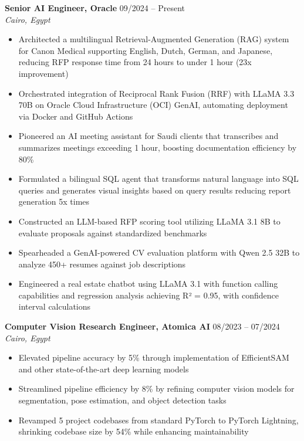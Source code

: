\documentclass[11pt]{article}
\begin{document}
\textbf{Senior AI Engineer, Oracle} \hfill 09/2024 – Present\\
\textit{Cairo, Egypt}
\begin{itemize}
\item Architected a multilingual Retrieval-Augmented Generation (RAG) system for Canon Medical supporting English, Dutch, German, and Japanese, reducing RFP response time from 24 hours to under 1 hour (23x improvement)
\item Orchestrated integration of Reciprocal Rank Fusion (RRF) with LLaMA 3.3 70B on Oracle Cloud Infrastructure (OCI) GenAI, automating deployment via Docker and GitHub Actions
\item Pioneered an AI meeting assistant for Saudi clients that transcribes and summarizes meetings exceeding 1 hour, boosting documentation efficiency by 80\%
\item Formulated a bilingual SQL agent that transforms natural language into SQL queries and generates visual insights based on query results reducing report generation 5x times
\item Constructed an LLM-based RFP scoring tool utilizing LLaMA 3.1 8B to evaluate proposals against standardized benchmarks
\item Spearheaded a GenAI-powered CV evaluation platform with Qwen 2.5 32B to analyze 450+ resumes against job descriptions
\item Engineered a real estate chatbot using LLaMA 3.1 with function calling capabilities and regression analysis achieving R² = 0.95, with confidence interval calculations
\end{itemize}

\textbf{Computer Vision Research Engineer, Atomica AI} \hfill 08/2023 – 07/2024\\
\textit{Cairo, Egypt}
\begin{itemize}
\item Elevated pipeline accuracy by 5\% through implementation of EfficientSAM and other state-of-the-art deep learning models
\item Streamlined pipeline efficiency by 8\% by refining computer vision models for segmentation, pose estimation, and object detection tasks
\item Revamped 5 project codebases from standard PyTorch to PyTorch Lightning, shrinking codebase size by 54\% while enhancing maintainability
\end{itemize}
\end{document}
